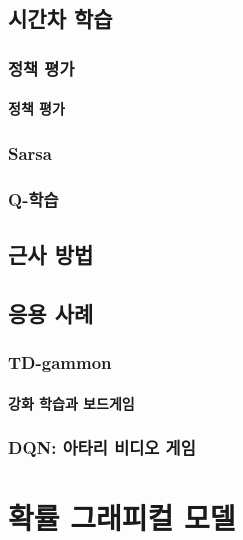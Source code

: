 \documentclass [12pt] {oblivoir}
\let\oldsubsubsection=\subsubsection
\renewcommand{\subsubsection}
{
  \filbreak
  \oldsubsubsection
}
\begin{document}
\vspace{3mm}

\subsection{시간차 학습}

\subsubsection{정책 평가}

\paragraph*{정책 평가}\mbox{}

\vspace{3mm}

\subsubsection{Sarsa}

\subsubsection{Q-학습}

\subsection{근사 방법}

\subsection{응용 사례}

\subsubsection{TD-gammon}

\paragraph*{강화 학습과 보드게임}\mbox{}

\vspace{3mm}

\subsubsection{DQN: 아타리 비디오 게임}

\newpage
\section{확률 그래피컬 모델}
\end{document}
